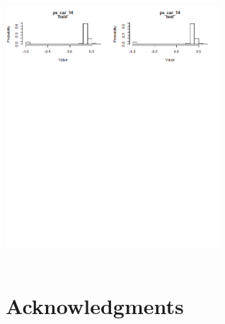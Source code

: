 \documentclass[fleqn,10pt]{SelfArx} %
\begin{document}
\includegraphics[width=8cm, height=10cm]{comp_4} \\

\section*{Acknowledgments} %







\end{document}
